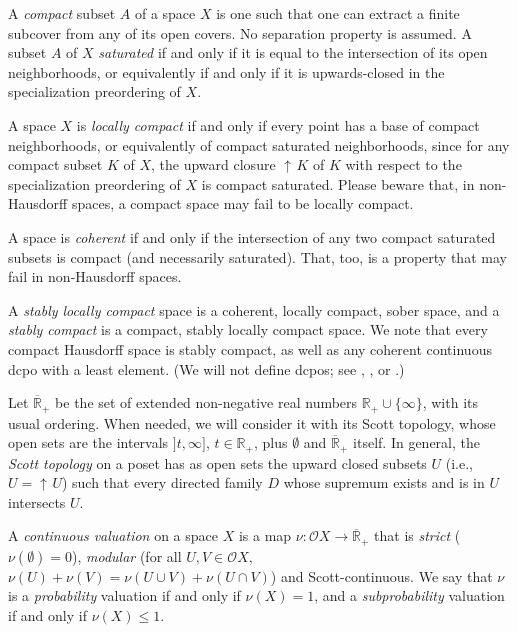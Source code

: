 \documentclass[preprint,12pt]{elsarticle}
\newcommand{\creal}{\overline{\mathbb{R}}_+}
\newcommand{\Rp}{\mathbb{R}_+}
\DeclareMathOperator{\upc}{\uparrow\!}
\newcommand\limp{\mathrel{\Rightarrow}}
\newcommand\Open{{\mathcal O}}
\newcommand\dsup{\sup\nolimits^{\scriptstyle\uparrow}}
\newcommand\dcup{\bigcup\nolimits^{\scriptstyle\uparrow}}
\begin{document}
A \emph{compact} subset $A$ of a space $X$ is one such that one can
extract a finite subcover from any of its open covers.  No separation
property is assumed.  A subset $A$ of $X$ \emph{saturated} if and only
if it is equal to the intersection of its open neighborhoods, or
equivalently if and only if it is upwards-closed in the specialization
preordering of $X$.

A space $X$ is \emph{locally compact} if and only if every point has a
base of compact neighborhoods, or equivalently of compact saturated
neighborhoods, since for any compact subset $K$ of $X$, the upward
closure $\upc K$ of $K$ with respect to the specialization preordering
of $X$ is compact saturated.  Please beware that, in non-Hausdorff
spaces, a compact space may fail to be locally compact.

A space is \emph{coherent} if and only if the intersection of any two
compact saturated subsets is compact (and necessarily saturated).
That, too, is a property that may fail in non-Hausdorff spaces.

A \emph{stably locally compact} space is a coherent, locally compact,
sober space, and a \emph{stably compact} is a compact, stably locally
compact space.  We note that every compact Hausdorff space is stably
compact, as well as any coherent continuous dcpo with a least element.
(We will not define dcpos; see \cite{JGL-topology}, \cite{AJ:domains},
or \cite{GHKLMS:contlatt}.)

Let $\creal$ be the set of extended non-negative real numbers
$\Rp \cup \{\infty\}$, with its usual ordering.  When needed, we will
consider it with its Scott topology, whose open sets are the intervals
$]t, \infty]$, $t \in \Rp$, plus $\emptyset$ and $\creal$ itself.  In
general, the \emph{Scott topology} on a poset has as open sets the
upward closed subsets $U$ (i.e., $U = \upc U$) such that every
directed family $D$ whose supremum exists and is in $U$ intersects
$U$.

A \emph{continuous valuation} on a space $X$ is a map
$\nu \colon \Open X \to \creal$ that is \emph{strict}
($\nu (\emptyset)=0$), %
\emph{modular} (for all $U, V \in \Open X$,
$\nu (U) + \nu (V) = \nu (U \cup V) + \nu (U \cap V)$) and
Scott-continuous.  %
We say that $\nu$ is a \emph{probability} valuation if and only if
$\nu (X)=1$, and a \emph{subprobability} valuation if and only if
$\nu (X) \leq 1$.
\end{document}
